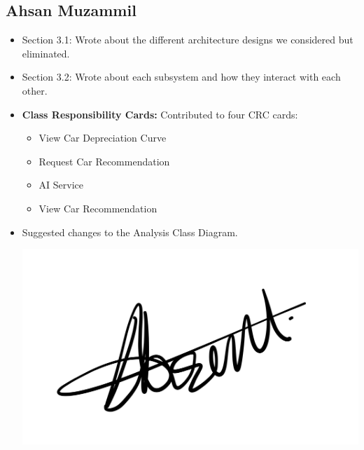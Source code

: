 \documentclass[]{article}
\begin{document}
\subsection{Ahsan Muzammil}
\begin{itemize}
  \item Section 3.1: Wrote about the different architecture designs we considered but eliminated.
  \item Section 3.2: Wrote about each subsystem and how they interact with each other.
  \item \textbf{Class Responsibility Cards:} Contributed to four CRC cards:
        \begin{itemize}
          \item View Car Depreciation Curve
          \item Request Car Recommendation
          \item AI Service
          \item View Car Recommendation
        \end{itemize}
  \item Suggested changes to the Analysis Class Diagram.
        \begin{center}
          \includegraphics[scale=0.1]{ahsan.jpeg}
        \end{center}
\end{itemize}
\end{document}
